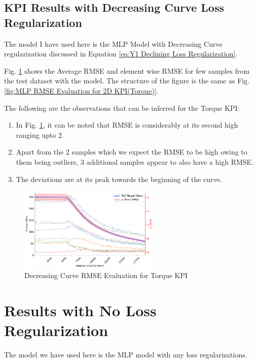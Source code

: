 \documentclass{report} %
\begin{document}
\subsection{KPI Results with Decreasing Curve Loss Regularization}\label{subsec:KPI Results with Decreasing curve Loss Regularization}
The model I have used here is the \ac{MLP} Model with Decreasing Curve regularization discussed in Equation \ref{eq:Y1 Declining Loss Regularization}.

Fig. \ref{fig:Decreasing Torque RMSE Evaluation for 2D KPI(Torque)} shows the Average \ac{RMSE} and element wise \ac{RMSE} for few samples from the test dataset 
with the model. The structure of the figure is the same as Fig. \ref{fig:MLP RMSE Evaluation for 2D KPI(Torque)}.

The following are the observations that can be inferred for the Torque \ac{KPI}:
\begin{enumerate}[nosep]
    \item In Fig. \ref{fig:Decreasing Torque RMSE Evaluation for 2D KPI(Torque)}, it can be noted that \ac{RMSE} is considerably at its second high 
    ranging upto 2.
    \item Apart from the 2 samples which we expect the \ac{RMSE} to be high owing to them being outliers, 3 additional samples appear to also have a high \ac{RMSE}.
    \item The deviations are at its peak towards the beginning of the curve.
\end{enumerate}

\begin{figure}[H]
    \centering
    \includegraphics[width=0.6\textwidth]{./ReportImages/RMSE_MLP_Decreasing_y1.png} 
    \caption{Decreasing Curve \ac{RMSE} Evaluation for Torque \ac{KPI}} 
    \label{fig:Decreasing Torque RMSE Evaluation for 2D KPI(Torque)}
\end{figure}

\section{Results with No Loss Regularization}\label{sec:Results with No Loss Regularization}
The model we have used here is the \ac{MLP} model with any loss regularizations.
\end{document}
